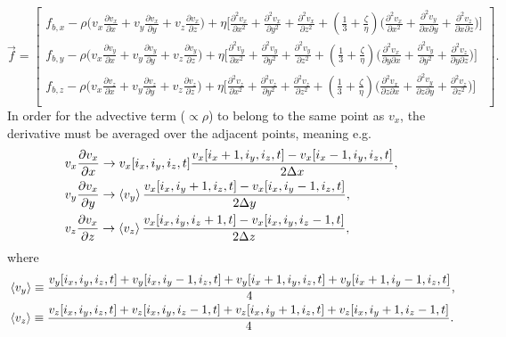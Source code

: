 \begin{equation}
	\vec{f}=\begin{bmatrix}
		f_{b,x}-\rho\big(v_x\frac{\partial v_x}{\partial x}+v_y\frac{\partial v_x}{\partial y}+v_z\frac{\partial v_x}{\partial z}\big)+\eta \big[\frac{\partial^2 v_x}{\partial x^2}+\frac{\partial^2 v_x}{\partial y^2}+\frac{\partial^2 v_x}{\partial z^2}+(\frac{1}{3}+\frac{\zeta}{\eta})\big(\frac{\partial^2 v_x}{\partial x^2}+\frac{\partial^2 v_y}{\partial x\partial y}+\frac{\partial^2 v_z}{\partial x\partial z}\big)\big]\\
		f_{b,y}-\rho\big(v_x\frac{\partial v_y}{\partial x}+v_y\frac{\partial v_y}{\partial y}+v_z\frac{\partial v_y}{\partial z}\big)+\eta \big[\frac{\partial^2 v_y}{\partial x^2}+\frac{\partial^2 v_y}{\partial y^2}+\frac{\partial^2 v_y}{\partial z^2}+(\frac{1}{3}+\frac{\zeta}{\eta})\big(\frac{\partial^2 v_x}{\partial y\partial x}+\frac{\partial^2 v_y}{\partial y^2}+\frac{\partial^2 v_z}{\partial y\partial z}\big)\big]\\
		f_{b,z}-\rho\big(v_x\frac{\partial v_z}{\partial x}+v_y\frac{\partial v_z}{\partial y}+v_z\frac{\partial v_z}{\partial z}\big)+\eta \big[\frac{\partial^2 v_z}{\partial x^2}+\frac{\partial^2 v_z}{\partial y^2}+\frac{\partial^2 v_z}{\partial z^2}+(\frac{1}{3}+\frac{\zeta}{\eta})\big(\frac{\partial^2 v_x}{\partial z\partial x}+\frac{\partial^2 v_y}{\partial z\partial y}+\frac{\partial^2 v_z}{\partial z^2}\big)\big]\\
	\end{bmatrix}.
\end{equation}
In order for the advective term ($\propto \rho$) to belong to the same point as $v_x$, the derivative must be averaged over the adjacent points, meaning e.g.
\begin{equation}
	\begin{split}
		&v_x\frac{\partial v_x}{\partial x} \rightarrow  v_x[i_x,i_y,i_z,t]\frac{v_x[i_x+1,i_y,i_z,t]-v_x[i_x-1,i_y,i_z,t]}{2\Delta x},\\
		&v_y\frac{\partial v_x}{\partial y}\rightarrow  \braket{v_y}\frac{v_x[i_x,i_y+1,i_z,t]-v_x[i_x,i_y-1,i_z,t]}{2\Delta y},\\
		&v_z\frac{\partial v_x}{\partial z}\rightarrow  \braket{v_z}\frac{v_x[i_x,i_y,i_z+1,t]-v_x[i_x,i_y,i_z-1,t]}{2\Delta z},\\
	\end{split}
\end{equation}
where
\begin{equation}
	\begin{split}
		&\braket{v_y}\equiv \frac{v_y[i_x,i_y,i_z,t]+v_y[i_x,i_y-1,i_z,t]+v_y[i_x+1,i_y,i_z,t]+v_y[i_x+1,i_y-1,i_z,t]}{4},\\
		&\braket{v_z}\equiv \frac{v_z[i_x,i_y,i_z,t]+v_z[i_x,i_y,i_z-1,t]+v_z[i_x,i_y+1,i_z,t]+v_z[i_x,i_y+1,i_z-1,t]}{4}.\\
	\end{split}
\end{equation}
